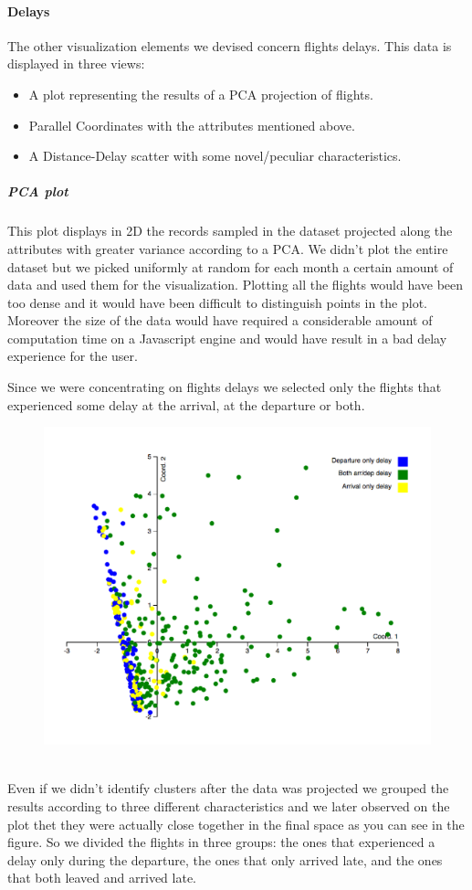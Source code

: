 \documentclass[a4paper, 12pt]{article}
\begin{document}
\paragraph*{Delays}
The other visualization elements we devised concern flights delays. This data is displayed in three views:
\begin{itemize}
\item A plot representing the results of a PCA projection of flights.
\item Parallel Coordinates with the attributes mentioned above.
\item A Distance-Delay scatter with some novel/peculiar characteristics.
\end{itemize}


\subparagraph{PCA plot} 
This plot displays in 2D the records sampled in the dataset projected along the attributes
with greater variance according to a PCA. We didn't plot the entire dataset but we picked uniformly
at random for each month a certain amount of data and used them for the visualization. Plotting all
the flights would have been too dense and it would have been difficult to distinguish points in the
plot. Moreover the size of the data would have required a considerable amount of computation time
on a Javascript engine and would have result in a bad delay experience for the user.


Since we were concentrating on flights delays we selected only the flights that experienced some delay
at the arrival, at the departure or both.
\\
\begin{figure}
\includegraphics[scale=0.7]{pca.PNG}
\end{figure}
\\ 
Even if we didn't identify clusters after the data was projected we grouped the results according to
three different characteristics and we later observed on the plot thet they were actually close
together in the final space as you can see in the figure. So we divided the flights in three groups: the
ones that experienced a delay only during the departure, the ones that only arrived late, and the ones
that both leaved and arrived late.
\\
\end{document}

